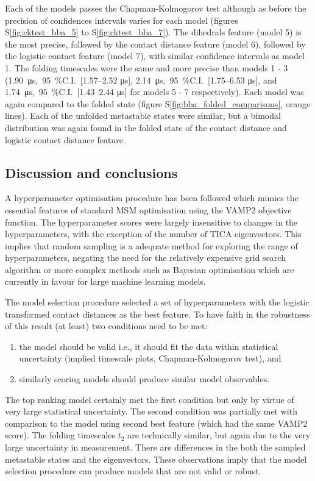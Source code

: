 \documentclass[journal=jacsat,manuscript=article]{achemso}
\newcommand{\SIci}[4]{\SI{#1}{#4},\ \SI{95}{\percent}C.I.\ [\numrange[range-phrase=---]{#2}{#3} \si{#4}]}
\newcommand*\sref[1]{%
    S\ref{#1}}
\begin{document}
Each of the models passes the Chapman-Kolmogorov test although as before the precision of  confidences intervals varies for each model (figures \sref{fig:cktest_bba_5} to \sref{fig:cktest_bba_7}). The dihedrals feature (model 5) is the most precise, followed by the contact distance feature (model 6), followed by the logistic contact feature (model 7), with similar confidence intervals as model 1. The folding timescales were the same and more precise than models 1 - 3 (\SIci{ 1.90}{ 1.57}{ 2.52}{\micro\second}, \SIci{ 2.14}{ 1.75}{ 6.53}{\micro\second}, and \SIci{ 1.74}{ 1.43}{ 2.44}{\micro\second} for models 5 - 7 respectively).  Each model was again compared to the folded state (figure \sref{fig:bba_folded_comparisons}, orange lines). Each of the unfolded metastable states were similar, but a bimodal distribution was again found in the folded state of the contact distance and logistic contact distance feature.  

\subsection{Discussion and conclusions}

A hyperparameter optimisation procedure has been followed which mimics the essential features of standard MSM optimisation using the VAMP2 objective function.  The hyperparameter scores were largely insensitive to changes in the hyperparameters, with the exception of the number of TICA eigenvectors.  This implies that random sampling is a adequate method for exploring the range of hyperparameters, negating the need for the relatively expensive grid search algorithm or more complex methods such as Bayesian optimisation which are currently in favour for large machine learning models.  

The model selection procedure selected a set of hyperparameters with the logistic transformed contact distances as the best feature.  To have faith in the robustness of this result (at least) two conditions need to be met: 
\begin{enumerate}
    \item the model should be valid i.e., it should fit the data within statistical uncertainty (implied timescale plots, Chapman-Kolmogorov test), and 
    \item similarly scoring models should produce similar model observables. 
\end{enumerate}
The top ranking model certainly met the first condition  but only by virtue of very large statistical uncertainty.  The second condition was partially met with comparison to the model using second best feature (which had the same VAMP2 score). The folding timescales $t_{2}$ are technically similar, but again due to the very large uncertainty in measurement. There are differences in the both the sampled metastable states and the eigenvectors. These observations imply that the model selection procedure can produce models that are not valid or robust. 
\end{document}
